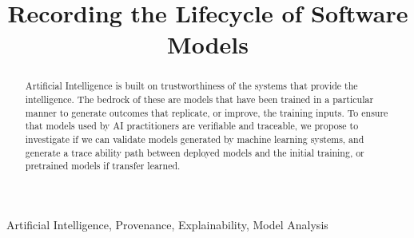 \documentclass[conference]{IEEEtran}
\begin{document}
\title{
Recording the Lifecycle of Software Models
}

\author{

}

\maketitle

\begin{abstract}
Artificial Intelligence is built on trustworthiness of the systems that provide the intelligence.
The bedrock of these are models that have been trained in a particular manner to generate outcomes that replicate, or improve, the training inputs. To ensure that models used by AI practitioners are verifiable and traceable, we propose to investigate if we can validate models generated by machine learning systems, and generate a trace ability path between deployed models and the initial training, or pretrained models if transfer learned.
\end{abstract}

\begin{IEEEkeywords}
Artificial Intelligence, Provenance, Explainability, Model Analysis\end{IEEEkeywords}







  
 
\end{document}
